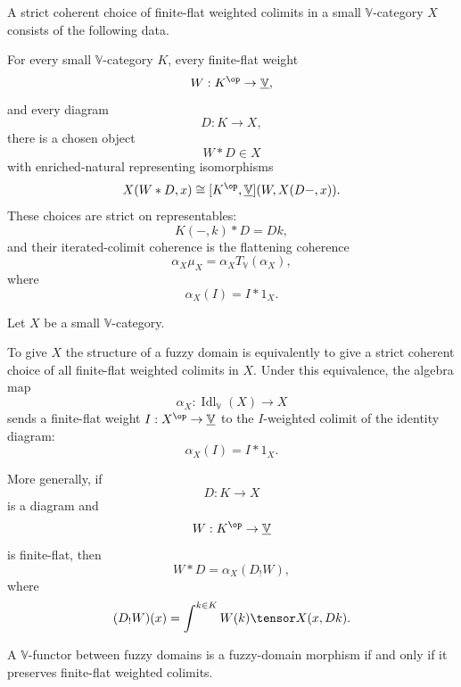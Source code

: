 \begin{definition}
\label{def:strict-coherent-ff-colimits-rewrite}
A strict coherent choice of finite-flat weighted colimits in a small
\(\mathbb V\)-category \(X\) consists of the following data.

For every small \(\mathbb V\)-category \(K\), every finite-flat weight
\[
    W:K^{\op}\to\underline{\mathbb V},
\]
and every diagram
\[
    D:K\to X,
\]
there is a chosen object
\[
    W*D\in X
\]
with enriched-natural representing isomorphisms
\[
    X(W*D,x)
    \cong
    [K^{\op},\underline{\mathbb V}](W,X(D-,x)).
\]
These choices are strict on representables:
\[
    K(-,k)*D=Dk,
\]
and their iterated-colimit coherence is the flattening coherence
\[
    \alpha_X\mu_X=\alpha_XT_{\mathbb V}(\alpha_X),
\]
where
\[
    \alpha_X(I)=I*1_X.
\]
\end{definition}

\begin{theorem}
\label{thm:fuzzy-domains-ff-colimits-rewrite}
Let \(X\) be a small \(\mathbb V\)-category.

To give \(X\) the structure of a fuzzy domain is equivalently to give a strict
coherent choice of all finite-flat weighted colimits in \(X\).  Under this
equivalence, the algebra map
\[
    \alpha_X:\operatorname{Idl}_{\mathbb V}(X)\to X
\]
sends a finite-flat weight \(I:X^{\op}\to\underline{\mathbb V}\) to the
\(I\)-weighted colimit of the identity diagram:
\[
    \alpha_X(I)=I*1_X.
\]

More generally, if
\[
    D:K\to X
\]
is a diagram and
\[
    W:K^{\op}\to\underline{\mathbb V}
\]
is finite-flat, then
\[
    W*D
    =
    \alpha_X(D_!W),
\]
where
\[
    (D_!W)(x)
    =
    \int^{k\in K}W(k)\tensor X(x,Dk).
\]

A \(\mathbb V\)-functor between fuzzy domains is a fuzzy-domain morphism if and
only if it preserves finite-flat weighted colimits.
\end{theorem}

